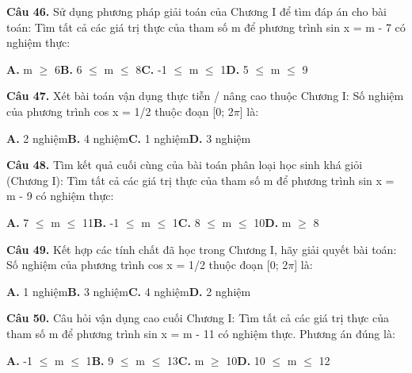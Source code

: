 \documentclass[11pt,a4paper]{article}
\begin{document}
\textbf{\color{primary} Câu 46.} Sử dụng phương pháp giải toán của Chương I để tìm đáp án cho bài toán: Tìm tất cả các giá trị thực của tham số m để phương trình sin x = m - 7 có nghiệm thực:\par
\hspace*{1.5em}\textbf{A.} m $\ge$ 6\quad\quad \textbf{B.} 6 $\le$ m $\le$ 8\quad\quad \textbf{C.} -1 $\le$ m $\le$ 1\quad\quad \textbf{D.} 5 $\le$ m $\le$ 9\par\vspace{2pt}
\textbf{\color{primary} Câu 47.} Xét bài toán vận dụng thực tiễn / nâng cao thuộc Chương I: Số nghiệm của phương trình cos x = 1/2 thuộc đoạn [0; 2$\pi$] là:\par
\hspace*{1.5em}\textbf{A.} 2 nghiệm\quad\quad \textbf{B.} 4 nghiệm\quad\quad \textbf{C.} 1 nghiệm\quad\quad \textbf{D.} 3 nghiệm\par\vspace{2pt}
\textbf{\color{primary} Câu 48.} Tìm kết quả cuối cùng của bài toán phân loại học sinh khá giỏi (Chương I): Tìm tất cả các giá trị thực của tham số m để phương trình sin x = m - 9 có nghiệm thực:\par
\hspace*{1.5em}\textbf{A.} 7 $\le$ m $\le$ 11\quad\quad \textbf{B.} -1 $\le$ m $\le$ 1\quad\quad \textbf{C.} 8 $\le$ m $\le$ 10\quad\quad \textbf{D.} m $\ge$ 8\par\vspace{2pt}
\textbf{\color{primary} Câu 49.} Kết hợp các tính chất đã học trong Chương I, hãy giải quyết bài toán: Số nghiệm của phương trình cos x = 1/2 thuộc đoạn [0; 2$\pi$] là:\par
\hspace*{1.5em}\textbf{A.} 1 nghiệm\quad\quad \textbf{B.} 3 nghiệm\quad\quad \textbf{C.} 4 nghiệm\quad\quad \textbf{D.} 2 nghiệm\par\vspace{2pt}
\textbf{\color{primary} Câu 50.} Câu hỏi vận dụng cao cuối Chương I: Tìm tất cả các giá trị thực của tham số m để phương trình sin x = m - 11 có nghiệm thực. Phương án đúng là:\par
\hspace*{1.5em}\textbf{A.} -1 $\le$ m $\le$ 1\quad\quad \textbf{B.} 9 $\le$ m $\le$ 13\quad\quad \textbf{C.} m $\ge$ 10\quad\quad \textbf{D.} 10 $\le$ m $\le$ 12\par\vspace{2pt}
\end{document}
